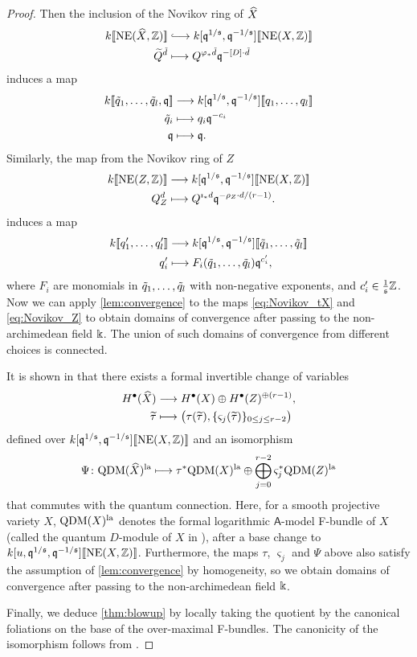 \documentclass[twoside,leqno]{article}
\numberwithin{equation}{section}
\theoremstyle{plain}
\theoremstyle{definition}
\begin{document}
\begin{proof}
Then the inclusion of the Novikov ring of $\widehat{X}$
\begin{align*}
  k\dbb{\NE(\tX, \bbZ)} &\hooklongrightarrow k[\fq^{1/\fs}, \fq^{-1/\fs}]\dbb{\NE(X,\bbZ)} \\
  \tQ^{\td} &\longmapsto Q^{\varphi_* \td} \fq^{-[D] \cdot \td}
\end{align*}
induces a map
\begin{align} \label{eq:Novikov_tX}
  k[\![\tilde q_1,\dots,\tilde q_l,\mathfrak q]\!] &\longrightarrow k[\mathfrak q^{1/\mathfrak s}, \mathfrak q^{-1/\mathfrak s}][\![q_1,\dots,q_l]\!] \\
  \tilde q_i &\longmapsto q_i \mathfrak q^{-c_i} \nonumber \\
  \mathfrak q &\longmapsto \mathfrak q . \nonumber
\end{align}
Similarly, the map from the Novikov ring of $Z$
\begin{align*}
  k[\![\operatorname{NE}(Z, \mathbb Z)]\!] &\longrightarrow k[\mathfrak q^{1/\mathfrak s}, \mathfrak q^{-1/\mathfrak s}][\![\operatorname{NE}(X,\mathbb Z)]\!] \\
  Q_Z^d &\longmapsto Q^{\imath_* d} \mathfrak q^{-\rho_Z \cdot d / (r-1)} .
\end{align*}
induces a map
\begin{align} \label{eq:Novikov_Z}
  k[\![q'_1,\dots,q'_l]\!] &\longrightarrow k[\mathfrak q^{1/\mathfrak s}, \mathfrak q^{-1/\mathfrak s}][\![\tilde q_1,\dots,\tilde q_l]\!] \\
  q'_i &\longmapsto F_i(\tilde q_1, \dots, \tilde q_l) \mathfrak q^{c'_i}, \nonumber
\end{align}
where $F_i$ are monomials in $\tilde q_1, \dots, \tilde q_l$ with non-negative exponents, and $c'_i \in \frac{1}{\mathfrak s}\mathbb Z$. Now we can apply \cref{lem:convergence} to the maps \ref{eq:Novikov_tX} and \ref{eq:Novikov_Z} to obtain domains of convergence after passing to the non-archimedean field $\Bbbk$.
The union of such domains of convergence from different choices is connected.

It is shown in \cite[Theorem 5.18]{Iritani_blowup} that there exists a formal invertible change of variables
\begin{align*}
H^{\bullet}(\widehat{X}) &\longrightarrow H^{\bullet}(X) \oplus H^{\bullet}(Z)^{\oplus(r-1)}, \\
\widetilde\tau &\longmapsto \big(\tau(\widetilde\tau), \{ \varsigma_j(\widetilde\tau)\}_{0 \le j \le r-2}\big)
\end{align*}
defined over $k[\mathfrak q^{1/\mathfrak s}, \mathfrak q^{-1/\mathfrak s}][\![\operatorname{NE}(X,\mathbb Z)]\!]$ and an isomorphism
\[ \Psi \colon \mathrm{QDM}(\widehat{X})^{\mathrm{la}} \longmapsto \tau^*\mathrm{QDM}(X)^{\mathrm{la}} \oplus \bigoplus_{j=0}^{r-2} \varsigma_j^*\mathrm{QDM}(Z)^{\mathrm{la}} \]
that commutes with the quantum connection.
Here, for a smooth projective variety $X$,  $\mathrm{QDM}(X)^{\mathrm{la}}$ denotes the formal logarithmic $\mathsf{A}$-model F-bundle of $X$ (called the quantum $D$-module of $X$ in \cite{Iritani_blowup}), after a  base change to $k[u, \mathfrak q^{1/\mathfrak s}, \mathfrak q^{-1/\mathfrak s}][\![\operatorname{NE}(X,\mathbb Z)]\!]$.
Furthermore, the maps $\tau$, $\varsigma_j$ and $\Psi$ above also satisfy the assumption of \cref{lem:convergence} by  homogeneity, so we obtain domains of convergence after passing to the non-archimedean field $\Bbbk$.

Finally, we deduce \cref{thm:blowup} by locally taking the quotient by the canonical foliations on the base of the over-maximal F-bundles.
The canonicity of the isomorphism follows from \cite[\S 5.4]{HYZZ_Decomposition}.
\end{proof}
\end{document}
